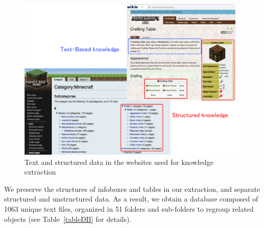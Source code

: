 \documentclass[12pt]{article}
\begin{document}
\begin{figure}[!ht]
	\centering \includegraphics[width=\textwidth]{Figures/Knowledge/websites.png}
	\caption{\label{websites}Text and structured data in the websites used for knowledge extraction}
\end{figure}

We preserve the structures of infoboxes and tables in our extraction, and separate structured and unstructured data. As a result, we obtain a database composed of 1063 unique text files, organized in 51 folders and sub-folders to regroup related objects (see Table~\ref{tableDB} for details).
\end{document}
